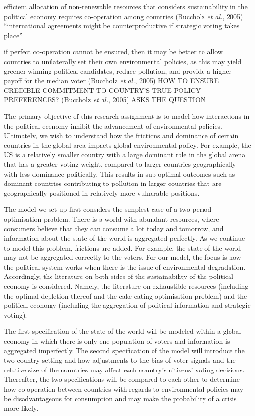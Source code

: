 \documentclass[11pt,preprint, authoryear]{elsarticle}
\numberwithin{equation}{section}
\numberwithin{figure}{section}
\numberwithin{table}{section}
\begin{document}
efficient allocation of non-renewable resources that considers
sustainability in the political economy requires co-operation among
countries (Buccholz \emph{et al.}, 2005) ``international agreements
might be counterproductive if strategic voting takes place''

if perfect co-operation cannot be ensured, then it may be better to
allow countries to unilaterally set their own environmental policies, as
this may yield greener winning political candidates, reduce pollution,
and provide a higher payoff for the median voter (Buccholz \emph{et
al.}, 2005) HOW TO ENSURE CREDIBLE COMMITMENT TO COUNTRY'S TRUE POLICY
PREFERENCES? (Buccholz \emph{et al.}, 2005) ASKS THE QUESTION

The primary objective of this research assignment is to model how
interactions in the political economy inhibit the advancement of
environmental policies. Ultimately, we wish to understand how the
frictions and dominance of certain countries in the global area impacts
global environmental policy. For example, the US is a relatively smaller
country with a large dominant role in the global arena that has a
greater voting weight, compared to larger countries geographically with
less dominance politically. This results in sub-optimal outcomes such as
dominant countries contributing to pollution in larger countries that
are geographically positioned in relatively more vulnerable positions.

The model we set up first considers the simplest case of a two-period
optimisation problem. There is a world with abundant resources, where
consumers believe that they can consume a lot today and tomorrow, and
information about the state of the world is aggregated perfectly. As we
continue to model this problem, frictions are added. For example, the
state of the world may not be aggregated correctly to the voters. For
our model, the focus is how the political system works when there is the
issue of environmental degradation. Accordingly, the literature on both
sides of the sustainability of the political economy is considered.
Namely, the literature on exhaustible resources (including the optimal
depletion thereof and the cake-eating optimisation problem) and the
political economy (including the aggregation of political information
and strategic voting).

The first specification of the state of the world will be modeled within
a global economy in which there is only one population of voters and
information is aggregated imperfectly. The second specification of the
model will introduce the two-country setting and how adjustments to the
bias of voter signals and the relative size of the countries may affect
each country's citizens' voting decisions. Thereafter, the two
specifications will be compared to each other to determine how
co-operation between countries with regards to environmental policies
may be disadvantageous for consumption and may make the probability of a
crisis more likely.
\end{document}
